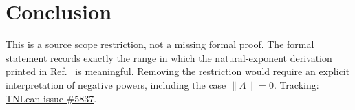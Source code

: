 \documentclass{article}
\begin{document}
\section{Conclusion}

This is a source scope restriction, not a missing formal proof. The formal
statement records exactly the range in which the natural-exponent derivation
printed in Ref.~\cite{Wolf2012Quantum} is meaningful. Removing the restriction
would require an explicit interpretation of negative powers, including the
case $\lVert\Lambda\rVert=0$. Tracking:
\href{https://github.com/LionSR/TNLean/issues/5837}{TNLean issue \#5837}.



\end{document}

